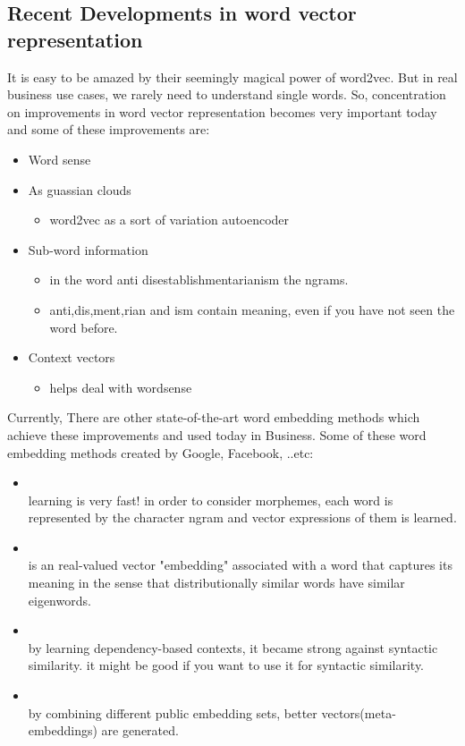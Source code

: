 \subsection{Recent Developments in word vector representation}
It is easy to be amazed by their seemingly magical power of word2vec. But in real business use cases, we rarely need to understand single words. So, concentration on improvements in word vector representation  becomes very important today and some of these improvements are:
\begin{itemize}
    \item Word sense
    \item As guassian clouds
       \begin{itemize}
              \item word2vec as a sort of variation autoencoder
       \end{itemize}
    \item Sub-word information
        \begin{itemize}
              \item in the word anti disestablishmentarianism the ngrams.
              \item anti,dis,ment,rian and ism contain meaning, even if you have not seen the word before.
       \end{itemize}
    \item Context vectors
       \begin{itemize}
             \item helps deal with wordsense
      \end{itemize}
\end{itemize}
 Currently, There are other state-of-the-art word embedding methods which achieve these improvements and used today in Business. Some of these word embedding methods created by Google, Facebook, ..etc:
 \begin{itemize}
     \item \textcite{fastText}\\
     learning is very fast! in order to consider morphemes, each word is represented by the character ngram and vector expressions of them is learned.
     \item \textcite{Eigenword}\\
     is an real-valued vector "embedding" associated with a word that captures its meaning in the sense that distributionally similar words have similar eigenwords.
     
     \item  \textcite{Dependency-Based Word Embeddings}\\
      by learning dependency-based contexts, it became strong against syntactic similarity. it might be good if you want to use it for syntactic similarity.
      
      \item \textcite{ Meta-embedding}\\
     by combining different public embedding sets, better vectors(meta-embeddings) are generated\cite{DBLP:conf/acl/YinS16}.
 \end{itemize} 









  


